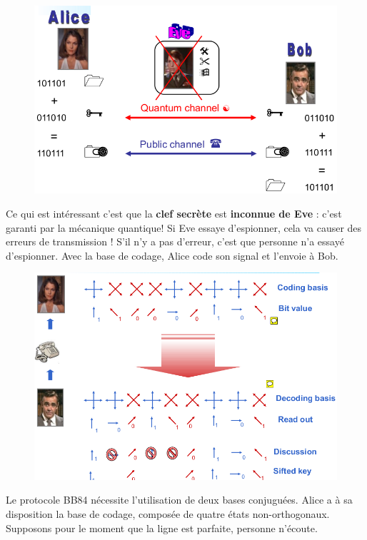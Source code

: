 	\begin{figure}
	\vspace{-5mm}
	\includegraphics[scale=0.2]{ch3/image6}
	\end{figure}
Ce qui est intéressant c'est que la \textbf{clef secrète} est \textbf{inconnue de Eve} : c'est
garanti par la mécanique quantique! Si Eve essaye d’espionner, cela va causer des erreurs de 
transmission ! S'il n'y a pas d'erreur, c'est que personne n'a essayé d’espionner. Avec la base
de codage, Alice code son signal et l'envoie à Bob. 

\newpage
	\begin{figure}
	\includegraphics[scale=0.2]{ch3/image7}
	\end{figure}
Le protocole BB84 nécessite l'utilisation de deux bases conjuguées. Alice a à sa disposition la
base de codage, composée de quatre états non-orthogonaux. Supposons pour le moment que la ligne
est parfaite, personne n'écoute.\\

